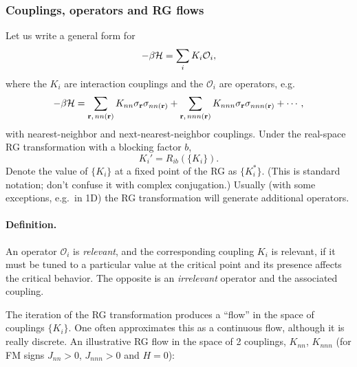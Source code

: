 \subsubsection*{Couplings, operators and RG flows}

Let us write a general form for
\begin{equation}
  -\beta\mathcal{H} = \sum_iK_i\mathcal{O}_i,
\end{equation}
where the $K_i$ are interaction couplings and the $\mathcal{O}_i$ are operators, e.g.
\begin{equation}
  -\beta\mathcal{H} = \sum_{\mathbf r,\,nn(\mathbf r)}K_{nn}\sigma_{\mathbf r}\sigma_{nn(\mathbf r)}
             + \sum_{\mathbf r,\,nnn(\mathbf r)}K_{nnn}\sigma_{\mathbf r}\sigma_{nnn(\mathbf r)} + \cdots,
\end{equation}
with nearest-neighbor and next-nearest-neighbor couplings. Under the real-space RG transformation with
a blocking factor $b$,
\begin{equation}
  K_i' = R_{ib}(\{K_i\}).
\end{equation}
Denote the value of $\{K_i\}$ at a fixed point of the RG as $\{K_i^*\}$. (This is standard notation;
don't confuse it with complex conjugation.) Usually (with some exceptions, e.g.\ in 1D) the RG
transformation will generate additional operators.

\paragraph{Definition.} An operator $\mathcal{O}_i$ is \emph{relevant}, and the corresponding coupling
$K_i$ is relevant, if it must be tuned to a particular value at the critical point and its presence
affects the critical behavior. The opposite is an \emph{irrelevant} operator and the associated coupling.

The iteration of the RG transformation produces a ``flow'' in the space of couplings $\{K_i\}$. One often
approximates this as a continuous flow, although it is really discrete. An illustrative RG flow in the
space of 2 couplings, $K_{nn}$, $K_{nnn}$ (for FM signs $J_{nn}>0$, $J_{nnn}>0$ and $H = 0$):

